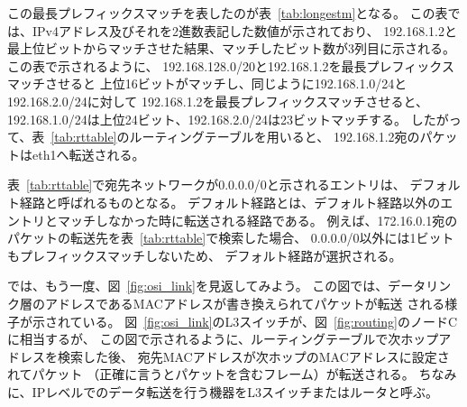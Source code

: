 この最長プレフィックスマッチを表したのが表~\ref{tab:longestm}となる。
この表では、IPv4アドレス及びそれを2進数表記した数値が示されており、
192.168.1.2と最上位ビットからマッチさせた結果、マッチしたビット数が3列目に示される。
この表で示されるように、
192.168.128.0/20と192.168.1.2を最長プレフィックスマッチさせると
上位16ビットがマッチし、同じように192.168.1.0/24と192.168.2.0/24に対して
192.168.1.2を最長プレフィックスマッチさせると、
192.168.1.0/24は上位24ビット、192.168.2.0/24は23ビットマッチする。
したがって、表~\ref{tab:rttable}のルーティングテーブルを用いると、
192.168.1.2宛のパケットはeth1へ転送される。

表~\ref{tab:rttable}で宛先ネットワークが0.0.0.0/0と示されるエントリは、
デフォルト経路と呼ばれるものとなる。
デフォルト経路とは、デフォルト経路以外のエントリとマッチしなかった時に転送される経路である。
例えば、172.16.0.1宛のパケットの転送先を表~\ref{tab:rttable}で検索した場合、
0.0.0.0/0以外には1ビットもプレフィックスマッチしないため、
デフォルト経路が選択される。

では、もう一度、図~\ref{fig:osi_link}を見返してみよう。
この図では、データリンク層のアドレスであるMACアドレスが書き換えられてパケットが転送
される様子が示されている。
図~\ref{fig:osi_link}のL3スイッチが、図~\ref{fig:routing}のノードCに相当するが、
この図で示されるように、ルーティングテーブルで次ホップアドレスを検索した後、
宛先MACアドレスが次ホップのMACアドレスに設定されてパケット
（正確に言うとパケットを含むフレーム）が転送される。
ちなみに、IPレベルでのデータ転送を行う機器をL3スイッチまたはルータと呼ぶ。

